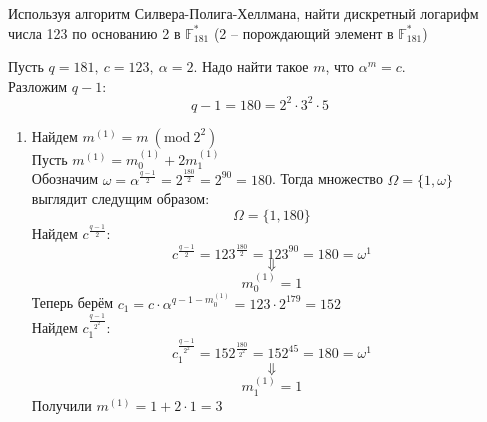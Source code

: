 \begin{problem}
    Используя алгоритм Силвера-Полига-Хеллмана, найти дискретный логарифм числа 123 по основанию 2 в \( \mathbb{F}_{181}^* \) (2 -- порождающий элемент в \( \mathbb{F}_{181}^* \))
\end{problem}
\begin{solution}
    Пусть \(q = 181, \ c = 123, \ \alpha = 2 \). Надо найти такое \(m\), что \(\alpha^m = c\). \\
    Разложим \(q - 1\):
    \[
    q - 1 = 180 = 2^2 \cdot 3^2 \cdot 5
    \]
    \begin{enumerate}
        \item Найдем \(m^{(1)} = m \ (\text{mod} \  2^2) \) \\
        Пусть \( m^{(1)} = m_0^{(1)} + 2m_1^{(1)} \) \\
        Обозначим \( \omega = \alpha^{\tfrac{q - 1}{2}} = 2^{\tfrac{180}{2}} = 2^{90} = 180 \). Тогда множество \(\Omega = \{ 1, \omega \} \) выглядит следущим образом:
        \[
        \Omega = \{ 1, 180 \}
        \]
        Найдем \(c^{\tfrac{q - 1}{2}} \):
        \[
        c^{\tfrac{q - 1}{2}} = 123^{\tfrac{180}{2}} = 123^{90} = 180 = \omega^1
        \]
        \[
        \Downarrow
        \]
        \[
        m_0^{(1)} = 1
        \]
        Теперь берём \( c_1 = c \cdot \alpha^{q - 1 - m_0^{(1)}} = 123 \cdot 2^{179} = 152\) \\
        Найдем \( c_1^{\tfrac{q - 1}{2^2}} \):
        \[
        c_1^{\tfrac{q - 1}{2^2}} = 152^{\tfrac{180}{2^2}} = 152^{45} = 180 = \omega^1
        \]
        \[
        \Downarrow
        \]
        \[
        m_1^{(1)} = 1
        \]
        Получили \(m^{(1)} = 1 + 2 \cdot 1 = 3\)


\end{enumerate}
\end{solution}
